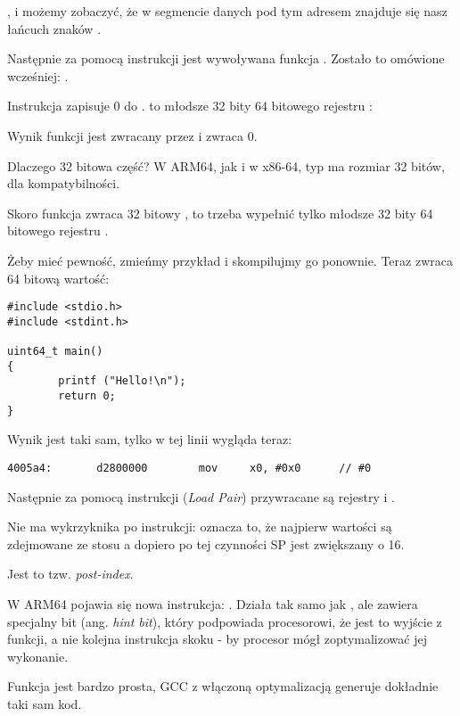 , i możemy zobaczyć, że w segmencie danych  pod tym adresem znajduje się nasz
łańcuch znaków .

Następnie za pomocą instrukcji  jest wywoływana funkcja \puts. Zostało to omówione wcześniej: .

Instrukcja \MOV zapisuje 0 do . 
 to młodsze 32 bity 64 bitowego rejestru :



Wynik funkcji jest zwracany przez  i \main zwraca 0.

Dlaczego 32 bitowa część?
W ARM64, jak i w x86-64, typ \Tint ma rozmiar 32 bitów, dla kompatybilności.

Skoro funkcja zwraca 32 bitowy \Tint, to trzeba wypełnić tylko młodsze 32 bity 64 bitowego rejestru .

Żeby mieć pewność, zmieńmy przykład i skompilujmy go ponownie.
Teraz \main zwraca 64 bitową wartość:

\begin{lstlisting}[caption=funkcja \main zwracająca wartość typu \TT{uint64\_t},style=customc]
#include <stdio.h>
#include <stdint.h>

uint64_t main()
{
        printf ("Hello!\n");
        return 0;
}
\end{lstlisting}

Wynik jest taki sam, tylko \MOV w tej linii wygląda teraz:

\begin{lstlisting}[caption=\NonOptimizing GCC 4.8.1 + objdump]
  4005a4:       d2800000        mov     x0, #0x0      // #0
\end{lstlisting}

Następnie za pomocą instrukcji  (\emph{Load Pair}) przywracane są rejestry  i .

Nie ma wykrzyknika po instrukcji: oznacza to, że najpierw wartości są zdejmowane ze stosu a dopiero po tej czynności \ac{SP} jest zwiększany o 16.

Jest to tzw. \emph{post-index}.

W ARM64 pojawia się nowa instrukcja: \RET. 
Działa tak samo jak , ale zawiera specjalny bit (ang. \emph{hint bit}),
który podpowiada procesorowi, że jest to wyjście z funkcji, a nie kolejna instrukcja skoku - by procesor mógł zoptymalizować jej wykonanie.

Funkcja jest bardzo prosta, GCC z włączoną optymalizacją generuje dokładnie taki sam kod.


